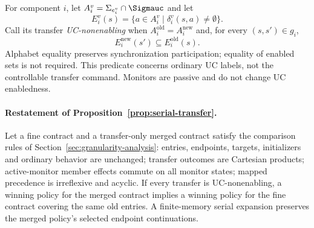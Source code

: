 For component $i$, let $A_i^v=\Sigma_{e_i^v}\cap\Sigmauc$ and let
\[
 E_i^v(s)=\{a\in A_i^v\mid\delta_i^v(s,a)\ne\emptyset\}.
\]
Call its transfer \emph{UC-nonenabling} when $A_i^{\mathrm{old}}=A_i^{\mathrm{new}}$ and, for every $(s,s')\in g_i$,
\[
 E_i^{\mathrm{new}}(s')\subseteq E_i^{\mathrm{old}}(s).
\]
Alphabet equality preserves synchronization participation; equality of enabled sets is not required. This predicate concerns ordinary UC labels, not the controllable transfer command. Monitors are passive and do not change UC enabledness.

\paragraph{Restatement of Proposition~\ref{prop:serial-transfer}.}
Let a fine contract and a transfer-only merged contract satisfy the comparison rules of Section~\ref{sec:granularity-analysis}: entries, endpoints, targets, initializers and ordinary behavior are unchanged; transfer outcomes are Cartesian products; active-monitor member effects commute on all monitor states; mapped precedence is irreflexive and acyclic. If every transfer is UC-nonenabling, a winning policy for the merged contract implies a winning policy for the fine contract covering the same old entries. A finite-memory serial expansion preserves the merged policy's selected endpoint continuations.
